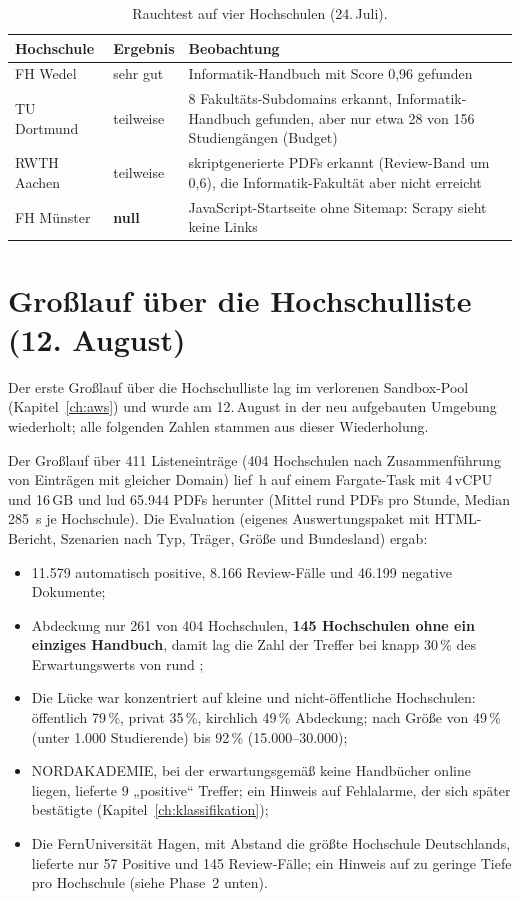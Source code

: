\begin{table}[htbp]
\centering\small
\caption{Rauchtest auf vier Hochschulen (24.\,Juli).}\label{tab:smoke}
\begin{tabularx}{\linewidth}{@{}l l X@{}}
\toprule
\textbf{Hochschule} & \textbf{Ergebnis} & \textbf{Beobachtung} \\
\midrule
FH Wedel & sehr gut & Informatik-Handbuch mit Score 0,96 gefunden \\
TU Dortmund & teilweise & 8 Fakultäts-Subdomains erkannt, Informatik-Handbuch gefunden, aber nur etwa 28 von 156 Studiengängen (Budget) \\
RWTH Aachen & teilweise & skriptgenerierte PDFs erkannt (Review-Band um 0,6), die Informatik-Fakultät aber nicht erreicht \\
FH Münster & \textbf{null} & JavaScript-Startseite ohne Sitemap: Scrapy sieht keine Links \\
\bottomrule
\end{tabularx}
\end{table}

\section{Großlauf über die Hochschulliste (12. August)}
Der erste Großlauf über die Hochschulliste lag im verlorenen Sandbox-Pool (Kapitel~\ref{ch:aws}) und wurde am 12.\,August in der neu aufgebauten Umgebung wiederholt; alle folgenden Zahlen stammen aus dieser Wiederholung.

Der Großlauf über 411 Listeneinträge (404 Hochschulen nach Zusammenführung von Einträgen mit gleicher Domain) lief \zDauerAug{}\,h auf einem Fargate-Task mit 4\,vCPU und 16\,GB und lud 65.944 PDFs herunter (Mittel rund \zRateAug{} PDFs pro Stunde, Median 285~s je Hochschule). Die Evaluation (eigenes Auswertungspaket mit HTML-Bericht, Szenarien nach Typ, Träger, Größe und Bundesland) ergab:
\begin{itemize}
  \item 11.579 automatisch positive, 8.166 Review-Fälle und 46.199 negative Dokumente;
  \item Abdeckung nur 261 von 404 Hochschulen, \textbf{145 Hochschulen ohne ein einziges Handbuch}, damit lag die Zahl der Treffer bei knapp 30\,\% des Erwartungswerts von rund \zZielwert{};
  \item Die Lücke war konzentriert auf kleine und nicht-öffentliche Hochschulen: öffentlich 79\,\%, privat 35\,\%, kirchlich 49\,\% Abdeckung; nach Größe von 49\,\% (unter 1.000 Studierende) bis 92\,\% (15.000--30.000);
  \item NORDAKADEMIE, bei der erwartungsgemäß keine Handbücher online liegen, lieferte 9 „positive“ Treffer; ein Hinweis auf Fehlalarme, der sich später bestätigte (Kapitel~\ref{ch:klassifikation});
  \item Die FernUniversität Hagen, mit Abstand die größte Hochschule Deutschlands, lieferte nur 57 Positive und 145 Review-Fälle; ein Hinweis auf zu geringe Tiefe pro Hochschule (siehe Phase~2 unten).
\end{itemize}

